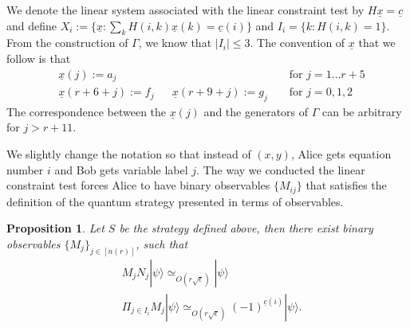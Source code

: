 \documentclass[11pt,letterpaper]{article}
\newcommand{\ket}[1]{|#1\rangle}
\newcommand{\1}{\mathbb{1}}
\newcommand{\nr}{n(r)}
\newcommand{\ux}{\underline{x}}
\newcommand{\uc}{\underline{c}}
\newcommand{\se}{\sqrt{\epsilon}}
\newcommand{\appd}[1]{\simeq_{#1}}
\newtheorem{proposition}[theorem]{Proposition}
\theoremstyle{definition}
\begin{document}
We denote the linear system associated with the linear constraint test by $H\underline{x} = \uc$ and
define $X_i := \{ \ux : \sum_{k} H(i,k)\ux(k) = \uc(i) \}$ and $I_i = \{ k : H(i,k) = 1\}$.
From the construction of $\Gamma$, we know that $| I_i| \leq 3$.
The convention of $\ux$ that we follow is that
\begin{align}
	&\ux(j) := a_j &&&&\text{ for } j = 1 \dots r+5 \\
	&\ux(r+6+j) := f_j&& \ux(r+9+j) := g_j &&\text{ for } j = 0,1,2 
\end{align} 
The correspondence between the $\ux(j)$ and the generators of $\Gamma$ can be arbitrary for $j > r+11$.

We slightly change the notation so that instead of $(x,y)$, Alice gets equation number $i$ and Bob gets variable label $j$.
The way we conducted the linear constraint test forces Alice to have binary observables $\{M_{ij}\}$ that satisfies the definition of the
quantum strategy presented in terms of observables.
\begin{proposition}
	\label{prop:lct_base}
	Let $S$ be the strategy defined above,
	then there exist binary observables $\{ M_j \}_{j \in [\nr]}$, such that
	\begin{align}
		&M_j N_j \ket{\psi} \appd{O(r\se)} \ket{\psi} \\
		&\Pi_{j \in I_i} M_j \ket{\psi} \appd{O(r\se)}(-1)^{\uc(i)} \ket{\psi}.
	\end{align}
\end{proposition}
\end{document}

